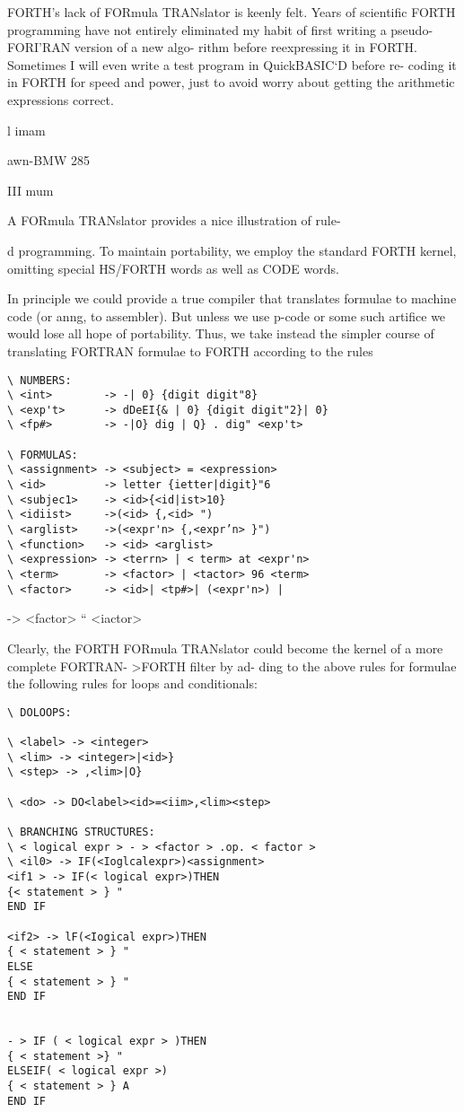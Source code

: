 FORTH’s lack of FORmula TRANslator is keenly felt. Years of
scientific FORTH programming have not entirely eliminated my
habit of first writing a pseudo-FORI'RAN version of a new algo-
rithm before reexpressing it in FORTH. Sometimes I will even
write a test program in QuickBASIC‘D before re- coding it in
FORTH for speed and power, just to avoid worry about getting
the arithmetic expressions correct.

l
imam

awn-BMW 285

III mum

A FORmula TRANslator provides a nice illustration of rule-

d programming. To maintain portability, we employ the
standard FORTH kernel, omitting special HS/FORTH words as
well as CODE words.

In principle we could provide a true compiler that translates
formulae to machine code (or anng, to assembler). But unless
we use p-code or some such artifice we would lose all hope of
portability. Thus, we take instead the simpler course of translating
FORTRAN formulae to FORTH according to the rules

\begin{verbatim}
\ NUMBERS:
\ <int>        -> -| 0} {digit digit"8}
\ <exp't>      -> dDeEI{& | 0} {digit digit"2}| 0}
\ <fp#>        -> -|O} dig | Q} . dig" <exp't>

\ FORMULAS:
\ <assignment> -> <subject> = <expression>
\ <id>         -> letter {ietter|digit}"6
\ <subjec1>    -> <id>{<id|ist>10}
\ <idiist>     ->(<id> {,<id> ")
\ <arglist>    ->(<expr'n> {,<expr’n> }")
\ <function>   -> <id> <arglist>
\ <expression> -> <terrn> | < term> at <expr'n>
\ <term>       -> <factor> | <tactor> 96 <term>
\ <factor>     -> <id>| <tp#>| (<expr'n>) |
\end{verbatim}

-> <factor> “ <iactor>

Clearly, the FORTH FORmula TRANslator could become the
kernel of a more complete FORTRAN- >FORTH filter by ad-
ding to the above rules for formulae the following rules for loops
and conditionals:

\begin{verbatim}
\ DOLOOPS:

\ <label> -> <integer>
\ <lim> -> <integer>|<id>}
\ <step> -> ,<lim>|O}

\ <do> -> DO<label><id>=<iim>,<lim><step>

\ BRANCHING STRUCTURES:
\ < logical expr > - > <factor > .op. < factor >
\ <il0> -> IF(<Ioglcalexpr>)<assignment>
<if1 > -> IF(< logical expr>)THEN
{< statement > } "
END IF

<if2> -> lF(<Iogical expr>)THEN
{ < statement > } "
ELSE
{ < statement > } "
END IF


- > IF ( < logical expr > )THEN
{ < statement >} "
ELSEIF( < logical expr >)
{ < statement > } A
END IF

\end{verbatim}

